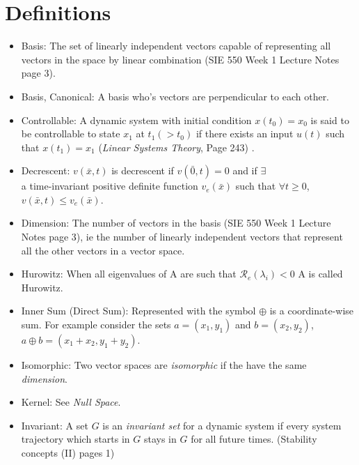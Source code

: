 \documentclass[12pt]{article}
\begin{document}
\section*{Definitions}

\begin{itemize}

\item Basis: The set of linearly independent vectors capable of representing all vectors in the space by linear combination (SIE 550 Week 1 Lecture Notes page 3).

\item Basis, Canonical: A basis who's vectors are perpendicular to each other. 

\item Controllable: A dynamic system with initial condition $x(t_0)=x_0$ is said to be controllable to state $x_1$ at $t_1(>t_0)$ if there exists an input $u(t)$ such that $x(t_1)=x_1$ ({\em Linear Systems Theory}, Page 243)  .

\item Decrescent: $v(\bar{x},t)$ is decrescent if $v(\bar{0},t)=0$ and if $\exists$ \\ a time-invariant positive definite function $v_e(\bar{x})$ such that $\forall t\geq0$, $v(\bar{x},t)\leq v_e(\bar{x})$.

\item Dimension: The number of vectors in the basis (SIE 550 Week 1 Lecture Notes page 3), ie the number of linearly independent vectors that represent all the other vectors in a vector space.

\item Hurowitz: When all eigenvalues of A are such that $\mathcal{R}_e(\lambda_i)<0$ A is called Hurowitz. 

\item Inner Sum (Direct Sum): Represented with the symbol $\oplus$ is a coordinate-wise sum. For example consider the sets $a=(x_1,y_1)$ and $b=(x_2, y_2)$, $a\oplus b=(x_1+x_2,y_1+y_2)$.

\item Isomorphic: Two vector spaces are {\em isomorphic} if the have the same {\em dimension}.

\item Kernel: See { \em Null Space}.

\item Invariant: A set $G$ is an {\em invariant set} for a dynamic system if every system trajectory which starts in $G$ stays in $G$ for all future times. (Stability concepts (II) pages 1)


\end{itemize}
\end{document}
